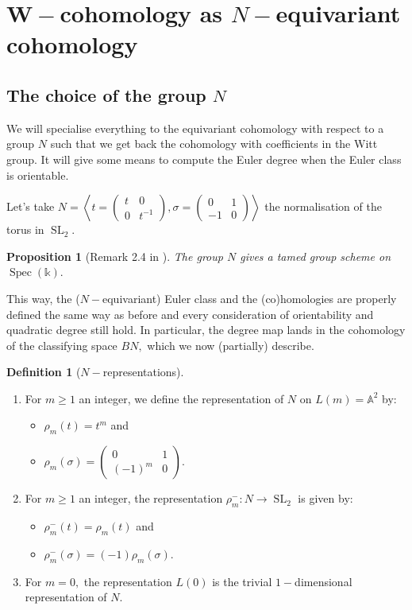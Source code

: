 \documentclass{amsart}
\theoremstyle{plain}%
\newtheorem{prop}[subsubsection]{Proposition}
\theoremstyle{remark}
\theoremstyle{definition}
\newtheorem{deff}[subsubsection]{Definition}
\newcommand{\eA}{\mathbb{A}}
\newcommand{\ek}{\mathbb{k}}
\newcommand{\bfW}{\mathbf{W}}
\newcommand{\SL}{\operatorname{SL}}
\newcommand{\Spec}[1]{\operatorname{Spec}\left(#1\right)}
\begin{document}
\section{$\bfW-$cohomology as $N-$equivariant cohomology}\label{SEC - cohom Witt equivariante}

\subsection{The choice of the group $N$}
We will specialise everything to the equivariant cohomology with respect to a group $N$ such that we get back the cohomology with coefficients in the Witt group. It will give some means to compute the Euler degree when the Euler class is orientable.

Let's take $N = \left\langle t = \left(\begin{array}{cc}
    t & 0 \\
    0 & t^{-1}
\end{array}\right) , \sigma = \left(\begin{array}{cc}
    0 & 1 \\
    -1 & 0
\end{array}\right) \right\rangle$ the normalisation of the torus in $\SL_2$. 


\begin{prop}[Remark 2.4 in \cite{LevineAB24}]
The group $N$ gives a tamed group scheme on $\Spec{\ek}.$
\end{prop}

This way, the ($N-$equivariant) Euler class and the (co)homologies are properly defined the same way as before and every consideration of orientability and quadratic degree still hold. In particular, the degree map lands in the cohomology of the classifying space $BN,$ which we now (partially) describe.

\begin{deff}[$N-$representations]\label{DEF - N rpz}
\cite[Section 6]{Levine_witt-val}
\begin{enumerate}
    \item For $m \geq 1$ an integer,  we define the representation of $N$ on $L(m) = \eA^2$ by: 
    \begin{itemize}
        \item $\rho_m(t) = t^m$ and
        \item $\rho_m(\sigma) = \left(\begin{array}{cc}
    0 & 1 \\
    (-1)^m & 0
\end{array}\right).$
    \end{itemize}
    \item For $m \geq 1$ an integer,  the representation $\rho_m^- : N \to \SL_2$ is given by: 
    \begin{itemize}
        \item $\rho_m^-(t) = \rho_m(t)$ and
        \item $\rho_m^-(\sigma) = (-1)\rho_m(\sigma).$
    \end{itemize}
    \item For $m = 0,$ the representation $L(0)$ is the trivial $1-$dimensional representation of $N$.
\end{enumerate}
\end{deff}
\end{document}
